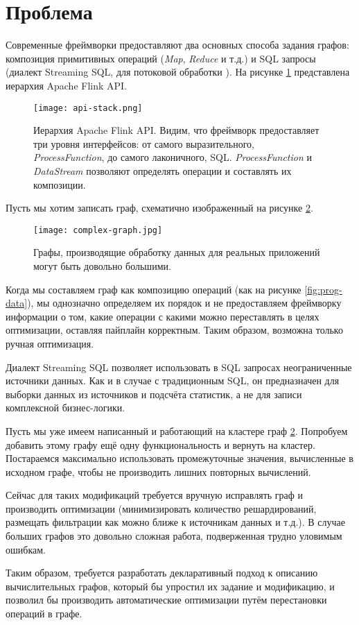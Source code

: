 \section{Проблема}

Современные фреймворки предоставляют два основных способа задания графов: композиция примитивных операций (\textit{Map}, \textit{Reduce} и т.д.) и SQL запросы (диалект Streaming SQL, для потоковой обработки \cite{streaming-sql}). На рисунке \ref{fig:api-stack} представлена иерархия  Apache Flink API.

\begin{figure}[h]
    \texttt{[image: api-stack.png]}
    \caption{Иерархия Apache Flink API. Видим, что фреймворк предоставляет три уровня интерфейсов: от самого выразительного, \textit{ProcessFunction}, до самого лаконичного, SQL. \textit{ProcessFunction} и \textit{DataStream} позволяют определять операции и составлять их композиции.}
    \label{fig:api-stack}
\end{figure}

Пусть мы хотим записать граф, схематично изображенный на рисунке \ref{fig:complex-graph}.

\begin{figure}[h]
    \centering
    \texttt{[image: complex-graph.jpg]}
    \caption{Графы, производящие обработку данных для реальных приложений могут быть довольно большими.}
    \label{fig:complex-graph}
\end{figure}

Когда мы составляем граф как композицию операций (как на рисунке \ref{fig:prog-data}),
мы однозначно определяем их порядок и не предоставляем фреймворку информации о том,
какие операции с какими можно переставлять в целях оптимизации, оставляя пайплайн корректным.
Таким образом, возможна только ручная оптимизация.

Диалект Streaming SQL позволяет использовать в SQL запросах неограниченные источники данных.
Как и в случае с традиционным SQL, он предназначен для выборки данных из источников и подсчёта статистик, а не для записи комплексной бизнес-логики.

Пусть мы уже имеем написанный и работающий на кластере граф \ref{fig:complex-graph}.
Попробуем добавить этому графу ещё одну функциональность и вернуть на кластер.
Постараемся максимально использовать промежуточные значения, вычисленные в исходном графе, чтобы не производить лишних повторных вычислений.

Сейчас для таких модификаций требуется вручную исправлять граф и производить оптимизации (минимизировать количество решардирований, размещать фильтрации как можно ближе к источникам данных и т.д.). В случае больших графов это довольно сложная работа, подверженная трудно уловимым ошибкам.

Таким образом, требуется разработать декларативный подход к описанию вычислительных графов, который бы упростил их задание и модификацию, и позволил бы производить автоматические оптимизации путём перестановки операций в графе.
